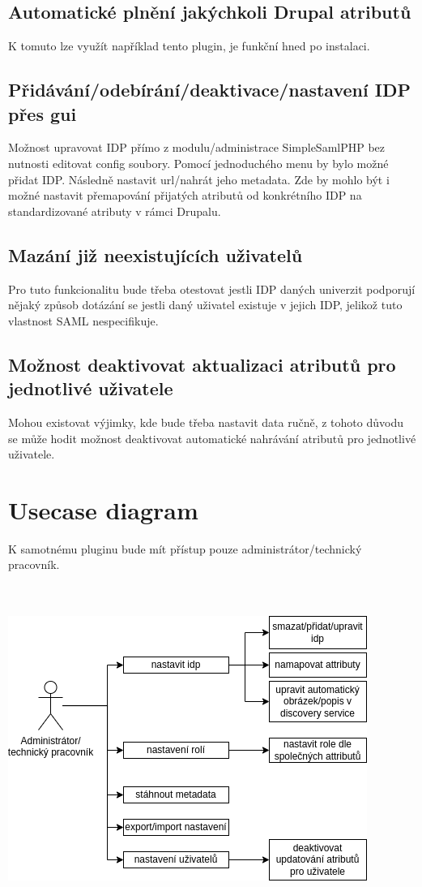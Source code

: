 \subsection{Automatické plnění jakýchkoli Drupal atributů}
K tomuto lze využít například tento plugin, je funkční hned po instalaci. \cite{SimpleSAMLphpDrupalAttr}

\subsection{Přidávání/odebírání/deaktivace/nastavení IDP přes gui}
Možnost upravovat IDP přímo z modulu/administrace SimpleSamlPHP bez nutnosti editovat config soubory. 
Pomocí jednoduchého menu by bylo možné přidat IDP. Následně nastavit url/nahrát jeho metadata.
Zde by mohlo být i možné nastavit přemapování přijatých atributů od konkrétního IDP na standardizované atributy v rámci Drupalu.

\subsection{Mazání již neexistujících uživatelů }
Pro tuto funkcionalitu bude třeba otestovat jestli IDP daných univerzit podporují nějaký způsob dotázání se jestli daný uživatel existuje v jejich IDP, jelikož tuto vlastnost SAML nespecifikuje.\\

\subsection{Možnost deaktivovat aktualizaci atributů pro jednotlivé uživatele}
Mohou existovat výjimky, kde bude třeba nastavit data ručně, z tohoto důvodu se může hodit možnost deaktivovat automatické nahrávání atributů pro jednotlivé uživatele.

\section{Usecase diagram}

K samotnému pluginu bude mít přístup pouze administrátor/technický pracovník.

\\ \\

\includegraphics[scale=0.8]{obrazky-figures/usecase-diagram.png}



